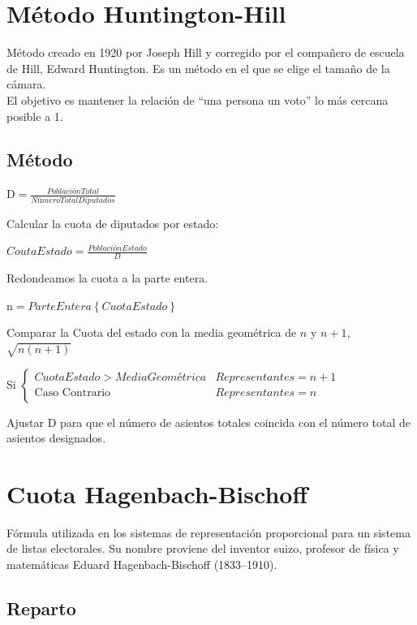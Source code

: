 \documentclass[12pt,a4paper,]{book}
\numberwithin{dummy}{section}
\theoremstyle{ocrenumbox}
\theoremstyle{blacknumex}
\theoremstyle{blacknumbox}
\theoremstyle{ocrenum}
\theoremstyle{ocrenum}
\begin{document}
\hypertarget{muxe9todo-huntington-hill}{%
\section{Método Huntington-Hill}\label{muxe9todo-huntington-hill}}

Método creado en 1920 por Joseph Hill y corregido por el compañero de
escuela de Hill, Edward Huntington. Es un método en el que se elige el
tamaño de la cámara.\\
El objetivo es mantener la relación de ``una persona un voto'' lo más
cercana posible a 1.

\hypertarget{muxe9todo}{%
\subsection{Método}\label{muxe9todo}}

\(\textrm{D} = \frac{Población Total}{NúmeroTotalDiputados}\)

Calcular la cuota de diputados por estado:

\(CoutaEstado = \frac{Población Estado}{D}\)

Redondeamos la cuota a la parte entera.

\(\textrm{n} = ParteEntera\left\{{Cuota Estado}\right\}\)

Comparar la Cuota del estado con la media geométrica de \(n\) y \(n+1\),
\(\sqrt{n(n+1)}\)

Si
\(\begin{cases}CuotaEstado>MediaGeométrica & Representantes = n+1\\\textrm{Caso Contrario} & Representantes = n\end{cases}\)

Ajustar D para que el número de asientos totales coincida con el número
total de asientos designados.

\hypertarget{cuota-hagenbach-bischoff}{%
\section{Cuota Hagenbach-Bischoff}\label{cuota-hagenbach-bischoff}}

Fórmula utilizada en los sistemas de representación proporcional para un
sistema de listas electorales. Su nombre proviene del inventor suizo,
profesor de física y matemáticas Eduard Hagenbach-Bischoff (1833--1910).

\hypertarget{reparto-2}{%
\subsection{Reparto}\label{reparto-2}}
\end{document}
